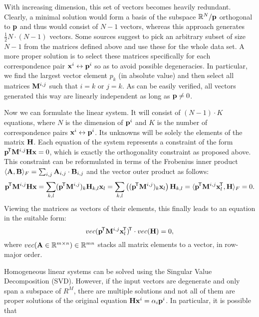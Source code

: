 With increasing dimension, this set of vectors becomes heavily redundant.
Clearly, a minimal solution would form a basis of the subspace $\mathbb{R}^N / \mathbf{p}$ orthogonal to $\mathbf{p}$ and thus would consist of $N - 1$ vectors, whereas this approach generates $\frac {1} {2} N \cdot (N - 1)$ vectors.
Some sources\cite{MVG} suggest to pick an arbitrary subset of size $N - 1$ from the matrices defined above and use these for the whole data set.
A more proper solution is to select these matrices specifically for each correspondence pair $\mathbf{x}^i \leftrightarrow \mathbf{p}^i$ so as to avoid possible degeneracies.
In particular, we find the largest vector element $p_k$ (in absolute value) and then select all matrices $\mathbf{M}^{i, j}$ such that $i = k$ or $j = k$.
As can be easily verified, all vectors generated this way are linearly independent as long as $\mathbf{p} \neq 0$.

Now we can formulate the linear system.
It will consist of $(N - 1) \cdot K$ equations, where $N$ is the dimension of $\mathbf{p}^i$ and $K$ is the number of correspondence pairs $\mathbf{x}^i \leftrightarrow \mathbf{p}^i$.
Its unknowns will be solely the elements of the matrix $\mathbf{H}$.
Each equation of the system represents a constraint of the form $\mathbf{p}^{\!\mathsf{T}} \mathbf{M}^{i, j} \mathbf{H} \mathbf{x} = 0$, which is exactly the orthogonality constraint as proposed above.
This constraint can be reformulated in terms of the Frobenius inner product $\langle \mathbf{A}, \mathbf{B} \rangle_F = \sum_{i, j} \mathbf{A}_{i, j} \cdot \mathbf{B}_{i, j}$ and the vector outer product as follows:
$$\mathbf{p}^{\!\mathsf{T}} \mathbf{M}^{i, j} \mathbf{H} \mathbf{x} = \sum_{k, l} (\mathbf{p}^{\!\mathsf{T}} \mathbf{M}^{i, j})_k \mathbf{H}_{k, l} \mathbf{x}_l = \sum_{k, l} \left( (\mathbf{p}^{\!\mathsf{T}} \mathbf{M}^{i, j})_k \mathbf{x}_l \right) \mathbf{H}_{k, l} = \langle \mathbf{p}^{\!\mathsf{T}} \mathbf{M}^{i, j} \mathbf{x}_l^{\!\mathsf{T}}, \mathbf{H} \rangle_F = 0.$$
Viewing the matrices as vectors of their elements, this finally leads to an equation in the suitable form:
$$vec(\mathbf{p}^{\!\mathsf{T}} \mathbf{M}^{i, j} \mathbf{x}_l^{\!\mathsf{T}})^{\!\mathsf{T}} \cdot vec(\mathbf{H}) = 0,$$
where $vec(\mathbf{A} \in \mathbb{R}^{m \times n}) \in \mathbb{R}^{mn}$ stacks all matrix elements to a vector, in row-major order.

Homogeneous linear systems can be solved using the Singular Value Decomposition (SVD).
However, if the input vectors are degenerate and only span a subspace of $R^M$, there are multiple solutions and not all of them are proper solutions of the original equation $\mathbf{H} \mathbf{x}^i = \alpha_i \mathbf{p}^i$.
In particular, it is possible that 
